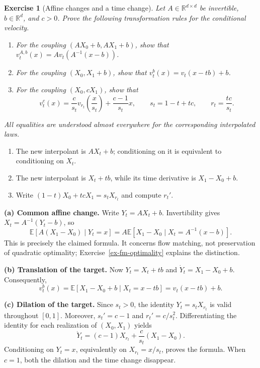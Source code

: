 \documentclass[11pt,a4paper]{article}
\theoremstyle{exostyle}
\newtheorem{exercise}{Exercise}
\newcommand{\R}{\mathbb{R}}
\newcommand{\EE}{\mathbb{E}}
\begin{document}
\begin{exercise}[Affine changes and a time change]\label{ex-fm-affine}
Let $A\in\R^{d\times d}$ be invertible, $b\in\R^d$, and $c>0$.
Prove the following transformation rules for the conditional velocity.
\begin{enumerate}[label=(\alph*)]
\item For the coupling $(AX_0+b,AX_1+b)$, show that
  $v_t^{A,b}(x)=A v_t(A^{-1}(x-b))$.
\item For the coupling $(X_0,X_1+b)$, show that
  $v_t^b(x)=v_t(x-tb)+b$.
\item For the coupling $(X_0,cX_1)$, show that
\[
  v_t^c(x)=\frac{c}{s_t}v_{r_t}\!\left(\frac{x}{s_t}\right)
      +\frac{c-1}{s_t}x,
  \qquad s_t=1-t+tc,\qquad r_t=\frac{tc}{s_t}.
\]
\end{enumerate}
All equalities are understood almost everywhere for the corresponding
interpolated laws.
\end{exercise}
\begin{hints}
\begin{enumerate}[label=(\alph*)]
\item The new interpolant is $AX_t+b$; conditioning on it is equivalent
  to conditioning on $X_t$.
\item The new interpolant is $X_t+tb$, while its time derivative is
  $X_1-X_0+b$.
\item Write $(1-t)X_0+tcX_1=s_tX_{r_t}$ and compute $r_t'$.
\end{enumerate}
\end{hints}
\begin{solution}
\textbf{(a) Common affine change.}
Write $Y_t=AX_t+b$. Invertibility gives $X_t=A^{-1}(Y_t-b)$, so
\[
  \EE[A(X_1-X_0)\mid Y_t=x]
     =A\EE[X_1-X_0\mid X_t=A^{-1}(x-b)].
\]
This is precisely the claimed formula. It concerns flow matching,
not preservation of quadratic optimality; Exercise~\ref{ex-fm-optimality}
explains the distinction.

\textbf{(b) Translation of the target.}
Now $Y_t=X_t+tb$ and $\dot Y_t=X_1-X_0+b$. Consequently,
\[
  v_t^b(x)=\EE[X_1-X_0+b\mid X_t=x-tb]=v_t(x-tb)+b.
\]

\textbf{(c) Dilation of the target.}
Since $s_t>0$, the identity $Y_t=s_tX_{r_t}$ is valid throughout $[0,1]$.
Moreover, $s_t'=c-1$ and $r_t'=c/s_t^2$. Differentiating the identity
for each realization of $(X_0,X_1)$ yields
\[
  \dot Y_t=(c-1)X_{r_t}+\frac{c}{s_t}(X_1-X_0).
\]
Conditioning on $Y_t=x$, equivalently on $X_{r_t}=x/s_t$, proves the
formula. When $c=1$, both the dilation and the time change disappear.
\end{solution}
\end{document}
